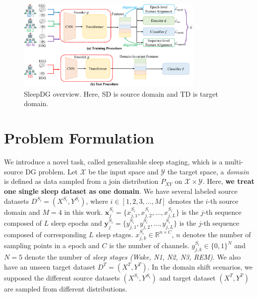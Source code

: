 \documentclass[letterpaper]{article} %
\begin{document}
	\begin{figure}[tb]
		\centering
		\small
		\includegraphics[width=0.8\textwidth]{model}
		\caption{SleepDG overview. Here, SD is source domain and TD is target domain.}
		\label{fig:model}
	\end{figure}

	\section{Problem Formulation}
	We introduce a novel task, called generalizable sleep staging, which is a multi-source DG problem.
	Let $\mathcal{X}$ be the input space and $\mathcal{Y}$ the target space, a \textit{domain} is defined as data sampled from a join distribution $P_{XY}$ on $\mathcal{X} \times \mathcal{Y}$.
	Here, \textbf{we treat one single sleep dataset as one domain}.
	We have several labeled source datasets $D^{S_i}=(X^{S_i}, Y^{S_i})$, where $i \in [1, 2, 3,..., M]$ denotes the $i$-th source domain and $M=4$ in this work.
	$\mathrm{\mathbf{x}}^{S_i}_j = \{x^{S_i}_{j, 1}, x^{S_i}_{j, 2}, ... , x^{S_i}_{j, L}\}$ is the $j$-th  sequence composed of $L$ sleep epochs and $\mathrm{\mathbf{y}}^{S_i}_j = \{y^{S_i}_{j, 1}, y^{S_i}_{j, 2}, ... , y^{S_i}_{j, L}\}$ is the $j$-th sequence composed of corresponding $L$ sleep stages.
	$x^{S_i}_{j, k} \in \mathbb{R}^{n \times C}$, $n$ denotes the number of sampling points in a epoch and $C$ is the number of channels.
	$y^{S_i}_{j, k} \in \{0, 1\}^N$ and $N=5$ denote the number of \textit{sleep stages (Wake, N1, N2, N3, REM)}.
	We also have an unseen target dataset $D^T=(X^T, Y^T)$.
	In the domain shift scenarios, we supposed the different source datasets $(X^{S_i}, Y^{S_i})$ and target dataset $(X^T, Y^T)$ are sampled from different distributions.
\end{document}
